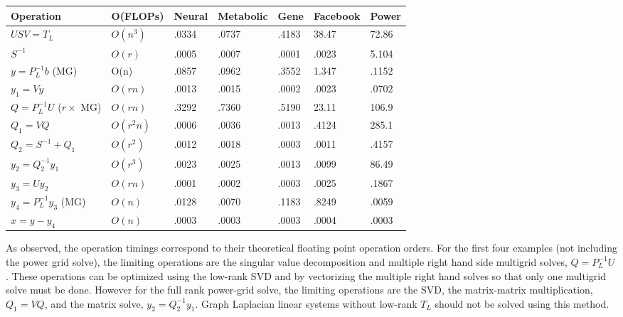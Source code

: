 \documentclass{article}
\begin{document}
\begin{center}
\renewcommand{\arraystretch}{1.5}
    \begin{tabular}{ | l | l | l | l | l | l | l |}
    \hline
    \textbf{Operation} & \textbf{O(FLOPs)} & Neural & Metabolic & Gene & Facebook & Power \\ \hline
    $USV = T_L$ & $O(n^3)$ & .0334 & .0737 & .4183 & 38.47 & 72.86  \\ \hline
    $S^{-1}$ & $O(r)$ & .0005 & .0007 & .0001 & .0023 & 5.104 \\ \hline
    $y = P_L^{-1}b$ (MG) & O(n) & .0857 & .0962 & .3552 & 1.347 & .1152  \\  \hline
    $y_1 = Vy$ & $O(rn)$ & .0013 & .0015 & .0002 & .0023 & .0702 \\ \hline
    $Q = P_L^{-1}U$ ($r\times$ MG) & $O(rn)$ & .3292 & .7360 & .5190 & 23.11 & 106.9  \\ \hline
    $Q_1 = VQ$ & $O(r^2 n)$ & .0006 & .0036 & .0013 & .4124 & 285.1 \\ \hline
    $Q_2 = S^{-1} + Q_1$ & $O(r^2)$ & .0012 & .0018 & .0003 & .0011 & .4157 \\ \hline
    $y_2 = Q_2^{-1}y_1$ & $O(r^3)$ & .0023 & .0025 & .0013 & .0099 & 86.49 \\ \hline
    $y_3 = Uy_2$ & $O(rn)$ & .0001 & .0002 & .0003 & .0025 & .1867 \\ \hline
    $y_4 = P_L^{-1}y_3$ (MG) & $O(n)$ &.0128 & .0070 & .1183 & .8249 & .0059 \\ \hline
    $x = y - y_4$ & $O(n)$ &.0003 & .0003 & .0003 & .0004 & .0003 \\
    \hline
    \end{tabular}
\end{center}
As observed, the operation timings correspond to their theoretical floating point operation orders. For the first four examples (not including the power grid solve), the limiting operations are the singular value decomposition and multiple right hand side multigrid solves, $Q = P_L^{-1}U$. These operations can be optimized using the low-rank SVD and by vectorizing the multiple right hand solves so that only one multigrid solve must be done. However for the full rank power-grid solve, the limiting operations are the SVD, the matrix-matrix multiplication, $Q_1 = VQ$, and the matrix solve, $y_2 = Q_2^{-1}y_1$. Graph Laplacian linear systems without low-rank $T_L$ should not be solved using this method.
\end{document}

